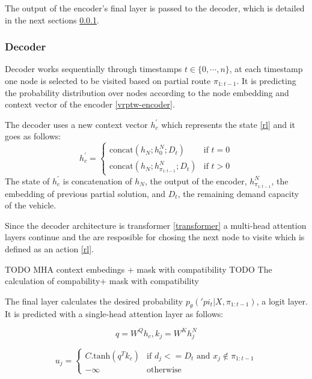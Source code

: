     The output of the encoder's final layer is passed to the decoder, which is detailed in the next sections \ref{vrptw-decoder}.
    
    \subsubsection{Decoder}\label{vrptw-decoder}
    Decoder works sequentially through timestamps $t \in \{0, \cdots, n\}$, at each timestamp one node is selected to be visited based on partial route $\pi_{1:t-1}$. It is predicting the probability distribution over nodes according to the node embedding and context vector of the encoder \ref{vrptw-encoder}.
    
    The decoder uses a new context vector $h_{c}^{'}$ which represents the state \ref{rl} and it goes as follows:
    \begin{equation}\label{decode-state-vec}
        h_{c}^{'} = \begin{cases} \text{concat}(h_N; h_0^N; D_t) & \mbox{if } t = 0 \\ \text{concat}(h_N; h_{\pi_{1:t-1}}^N; D_t) & \mbox{if } t > 0 \end{cases}
    \end{equation}
    The state of $h_{c}^{'}$ is concatenation of $h_N$, the output of the encoder, $h_{\pi_{1:t-1}}^N$, the embedding of previous partial solution, and $D_t$, the remaining demand capacity of the vehicle.
    
    Since the decoder architecture is transformer \ref{transformer} a multi-head attention layers continue and the are resposible for chosing the next node to visite which is defined as an action \ref{rl}.
    
    TODO MHA context embedings + mask with compatibility
    TODO The calculation of compability+ mask with compatibility
    
    The final layer calculates the desired probability $p_{\theta}('pi_t|X, \pi_{1:t-1})$, a logit layer. It is predicted with a single-head attention layer as follows:
    
    \begin{equation}
        q = W^Q h_c, k_j = W^K h_j^N
    \end{equation}
    
    \begin{equation}
        u_j = \begin{cases} C . \text{tanh}(q^T k_{c}) &\mbox{if }  d_j <= D_t \text{ and } x_j \notin \pi_{1:t-1} \\ -\infty &\mbox{otherwise} \end{cases}
    \end{equation}
    
